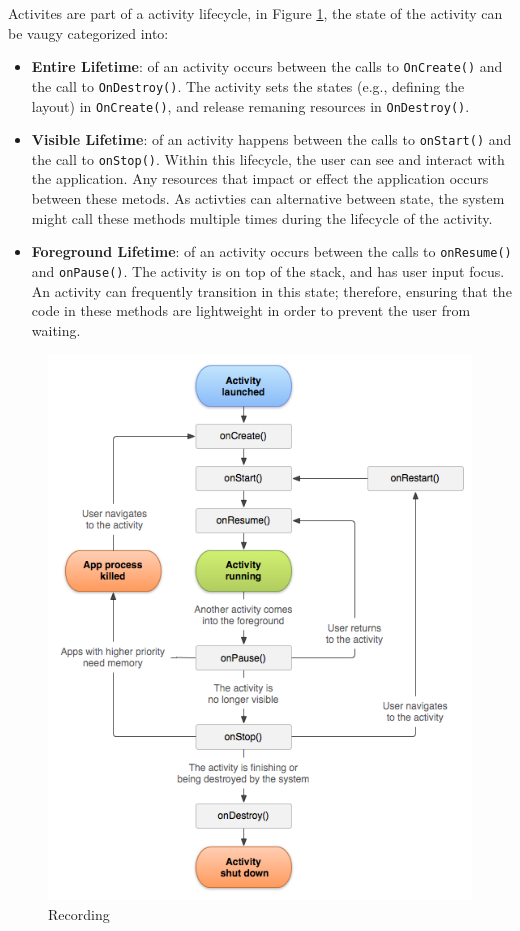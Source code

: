 Activites are part of a activity lifecycle, in Figure \ref{fig:lifecycle}, the state of the activity can be vaugy categorized into:
\begin{itemize}
    \item \textbf{Entire Lifetime}: of an activity occurs between the calls to \verb|OnCreate()| and the call to \verb|OnDestroy()|. The activity sets the states (e.g., defining the layout) in \verb|OnCreate()|, and release remaning resources in \verb|OnDestroy()|.
    \item \textbf{Visible Lifetime}: of an activity happens between the calls to \verb|onStart()| and the call to \verb|onStop()|. Within this lifecycle, the user can see and interact with the application. Any resources that impact or effect the application occurs between these metods. As activties can alternative between state, the system might call these methods multiple times during the lifecycle of the activity.
    \item \textbf{Foreground Lifetime}: of an activity occurs between the calls to \verb|onResume()| and \verb|onPause()|. The activity is on top of the stack, and has user input focus. An activity can frequently transition in this state; therefore, ensuring that the code in these methods are lightweight in order to prevent the user from waiting. 
\end{itemize} 

\begin{figure}
    \centering
    \includegraphics[scale=0.6]{images/androidlifecycle.png}
    \caption{Recording}
    \label{fig:lifecycle}
\end{figure}

